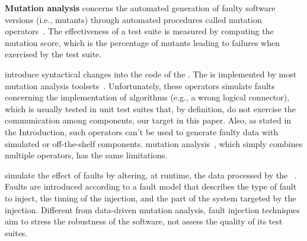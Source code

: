 \textbf{Mutation analysis} concerns the automated generation of faulty software versions (i.e., mutants) through automated procedures called mutation operators~\cite{jia2010analysis,papadakis2019mutation}. The effectiveness of a test suite is measured by computing the mutation score, which is the percentage of mutants leading to failures when exercised by the test suite.

 introduce syntactical changes into the code of the . The   is implemented by most mutation analysis toolsets~\cite{offutt1996experimental,rothermel1996experimental,andrews2005mutation,kintis2017detecting,offutt1996experimental}.
Unfortunately, these operators simulate faults concerning the implementation of algorithms (e.g., a wrong logical connector), which is usually tested in unit test suites that, by definition, do not exercise the communication among components, our target in this paper.
Also, as stated in the Introduction, such operators can't be used to generate faulty data with simulated or off-the-shelf components.
 mutation analysis~\cite{harman2010manifesto}, which simply combines multiple operators, has the same limitations.






 simulate the effect of faults by altering, at runtime, the data processed by the ~\cite{natella2016assessing}. Faults are introduced according to a fault model that describes the type of fault to inject, the timing of the injection, and the part of the system targeted by the injection. Different from data-driven mutation analysis, fault injection techniques aim to stress the robustness of the software,
not assess the quality of its test suites.



